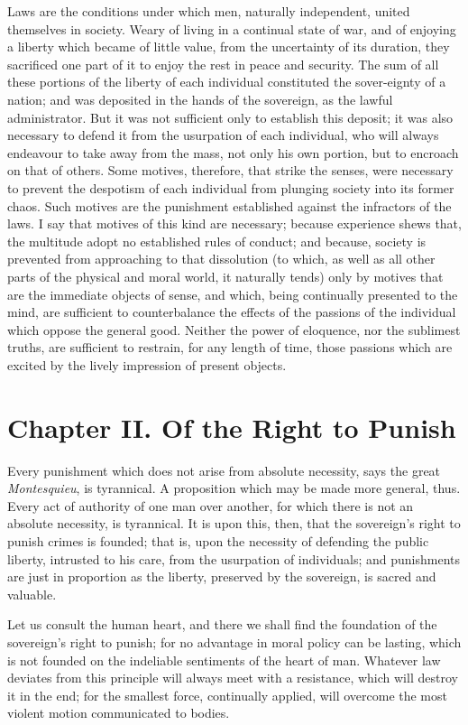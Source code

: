 Laws are the conditions under which men, naturally independent, united
themselves in society. Weary of living in a continual state of war,
and of enjoying a liberty which became of little value, from the
uncertainty of its duration, they sacrificed one part of it to enjoy
the rest in peace and security. The sum of all these portions of the
liberty of each individual constituted the sover-eignty of a
nation; and was deposited in the hands of the sovereign, as the lawful
administrator. But it was not sufficient only to establish this
deposit; it was also necessary to defend it from the usurpation of
each individual, who will always endeavour to take away from the mass,
not only his own portion, but to encroach on that of others. Some
motives, therefore, that strike the senses, were necessary to prevent
the despotism of each individual from plunging society into its former
chaos. Such motives are the punishment established against the
infractors of the laws. I say that motives of this kind are necessary;
because experience shews that, the multitude adopt no established
rules of conduct; and because, society is prevented from approaching
to that dissolution (to which, as well as all other parts of the
physical and moral world, it naturally tends) only by motives that are
the immediate objects of sense, and which, being continually presented
to the mind, are sufficient to counterbalance the effects of the
passions of the individual which oppose the general good. Neither the
power of eloquence, nor the sublimest truths, are sufficient to
restrain, for any length of time, those passions which are excited by
the lively impression of present objects.

\section*{Chapter II. Of the Right to Punish}

Every punishment which does not arise from absolute necessity, says
the great \textit{Montesquieu}, is tyrannical. A proposition which may
be made more general, thus. Every act of authority of one man over
another, for which there is not an absolute necessity, is tyrannical.
It is upon this, then, that the sovereign's right to punish crimes is
founded; that is, upon the necessity of defending the public liberty,
intrusted to his care, from the usurpation of individuals; and
punishments are just in proportion as the liberty, preserved by the
sovereign, is sacred and valuable.

Let us consult the human heart, and there we shall find the foundation
of the sovereign's right to punish; for no advantage in moral policy
can be lasting, which is not founded on the indeliable sentiments of
the heart of man. Whatever law deviates from this principle will
always meet with a resistance, which will destroy it in the end; for
the smallest force, continually applied,  will overcome the
most violent motion communicated to bodies.

